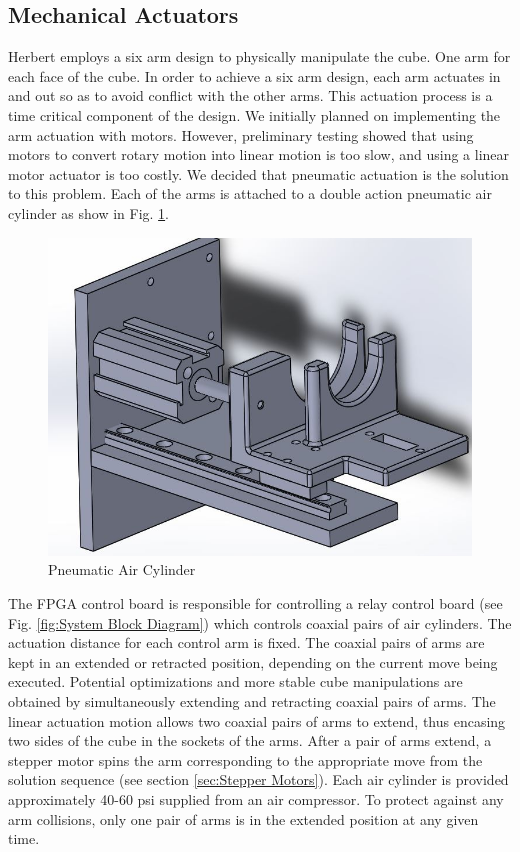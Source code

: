 \documentclass[final, letterpaper, 10 pt, conference, twocolumn]{IEEEtran}
\begin{document}
\subsection{Mechanical Actuators}
\label{sec:Mechanical Actuators}
Herbert employs a six arm design to physically manipulate the cube. One arm for each face of the cube. In order to achieve a six arm design, each arm actuates in and out so as to avoid conflict
with the other arms. This actuation process is a time critical component of
the design.  We initially planned on implementing the
arm actuation with motors.  However, preliminary testing showed that using
motors to convert rotary motion into linear motion is too slow, and using a linear motor
actuator is too costly. We decided that pneumatic actuation is the solution to this problem.  Each of the arms is attached to a double action pneumatic air cylinder as show in Fig. \ref{fig:Pneumatic Air Cylinder}.

\begin{figure}[!ht]
\centering
\includegraphics[scale=0.28]{AirCylinder.jpg}
\caption{Pneumatic Air Cylinder}
\label{fig:Pneumatic Air Cylinder}
\end{figure}

The FPGA control board is responsible for controlling a relay control board (see Fig. \ref{fig:System Block Diagram}) which controls coaxial pairs of air cylinders. The actuation distance for each control arm is fixed. The coaxial pairs of arms are kept in an extended or retracted position, depending on the current move being executed. Potential optimizations and more stable cube manipulations  are obtained by simultaneously extending and retracting coaxial pairs of arms. The linear actuation motion allows two coaxial pairs of
arms to extend, thus encasing two sides of the cube in the sockets of the arms. After a pair of arms extend,
a stepper motor spins the arm corresponding to the appropriate move from the solution sequence (see section \ref{sec:Stepper Motors}). Each air cylinder is provided approximately 40-60 psi supplied from an air compressor. To protect against any arm collisions, only one pair of arms is in the extended position at any given time.
\end{document}
